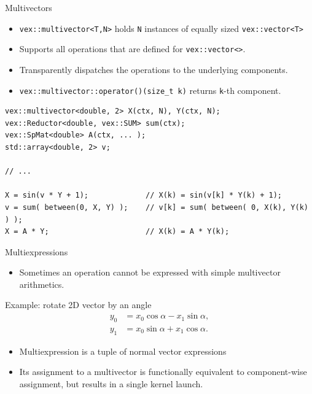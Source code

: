 \documentclass[@BEAMER_OPTIONS@]{beamer}
\newcommand{\code}[1]{\lstinline|#1|}
\begin{document}
\begin{frame}[fragile]{Multivectors}
    \begin{itemize}
        \item \code{vex::multivector<T,N>} holds \code{N} instances of equally
            sized \code{vex::vector<T>}
        \item Supports all operations that are defined for
            \code{vex::vector<>}.
        \item Transparently dispatches the operations to the underlying
            components.
        \item \code{vex::multivector::operator()(size_t k)} returns \code{k}-th
            component.
    \end{itemize}
    \begin{exampleblock}{}
        \begin{lstlisting}
vex::multivector<double, 2> X(ctx, N), Y(ctx, N);
vex::Reductor<double, vex::SUM> sum(ctx);
vex::SpMat<double> A(ctx, ... );
std::array<double, 2> v;

// ...

X = sin(v * Y + 1);             // X(k) = sin(v[k] * Y(k) + 1);
v = sum( between(0, X, Y) );    // v[k] = sum( between( 0, X(k), Y(k) ) );
X = A * Y;                      // X(k) = A * Y(k);
        \end{lstlisting}
    \end{exampleblock}
\end{frame}


\begin{frame}[fragile]{Multiexpressions}
    \begin{itemize}
        \item Sometimes an operation cannot be expressed with simple
            multivector arithmetics.
    \end{itemize}
    \begin{block}{Example: rotate 2D vector by an angle}
        \vspace{-1\baselineskip}
        \begin{align*}
            y_0 &= x_0 \cos \alpha - x_1 \sin \alpha, \\
            y_1 &= x_0 \sin \alpha + x_1 \cos \alpha.
        \end{align*}
    \end{block}

    \begin{itemize}
        \item Multiexpression is a tuple of normal vector expressions
        \item Its assignment to a multivector is functionally equivalent to
            component-wise assignment, but results in a single kernel launch.
    \end{itemize}
\end{frame}
\end{document}
